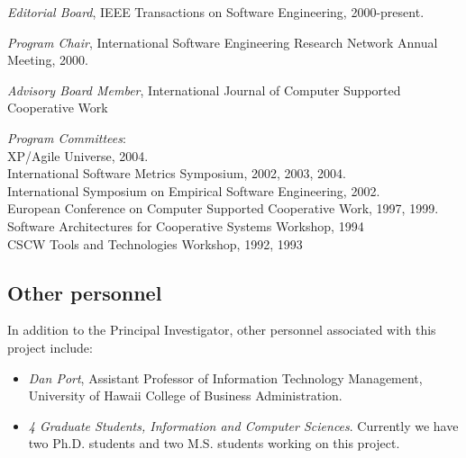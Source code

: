 \begin{Professional Activities}
\item {\em Editorial Board}, IEEE Transactions on Software Engineering,
2000-present.

\item {\em Program Chair}, International Software Engineering Research Network
 Annual Meeting, 2000.

\item {\em Advisory Board Member}, 
  International Journal of Computer Supported Cooperative Work

\item {\em Program Committees}: \\
  XP/Agile Universe,  2004. \\
  International Software Metrics Symposium, 2002, 2003, 2004. \\
  International Symposium on Empirical Software Engineering, 2002.\\
  European Conference on Computer Supported Cooperative Work, 1997, 1999.\\
  Software Architectures for Cooperative Systems Workshop, 1994 \\
  CSCW Tools and Technologies Workshop, 1992, 1993 \\

\end{Professional Activities}


\subsection{Other personnel}

In addition to the Principal Investigator, other personnel associated with
this project include:

\begin{itemize}

\item {\em Dan Port}, Assistant Professor of Information Technology
Management, University of Hawaii College of Business Administration.

\item {\em 4 Graduate Students, Information and Computer
Sciences}. Currently we have two Ph.D. students and two M.S. students
working on this project.

\end{itemize}


